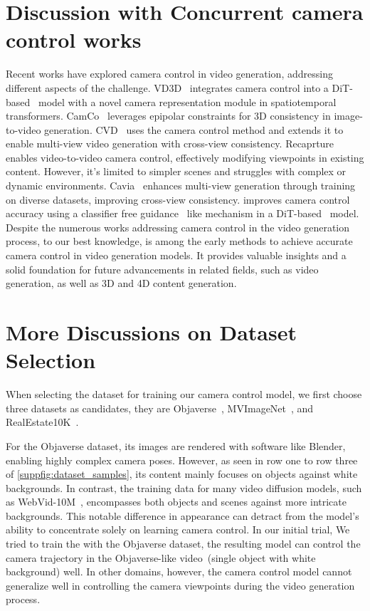 \section{Discussion with Concurrent camera control works} \label{suppsec:discuss_cameractrl}
Recent works have explored camera control in video generation, addressing different aspects of the challenge.
%
VD3D~\citep{vd3d} integrates camera control into a DiT-based~\citep{dit,snapvideo} model with a novel camera representation module in spatiotemporal transformers. 
%
CamCo~\citep{camco} leverages epipolar constraints for 3D consistency in image-to-video generation.
%
CVD~\citep{cvd} uses the camera control method and extends it to enable multi-view video generation with cross-view consistency.
%
Recaprture~\citep{recapture} enables video-to-video camera control, effectively modifying viewpoints in existing content.
%
However, it's limited to simpler scenes and struggles with complex or dynamic environments.
%
Cavia~\citep{cavia} enhances multi-view generation through training on diverse datasets, improving cross-view consistency.
%
\citep{cmg} improves camera control accuracy using a classifier free guidance~\cite{cfg} like mechanism in a DiT-based~\cite{opensora} model.
%
Despite the numerous works addressing camera control in the video generation process, to our best knowledge, \method is among the early methods to achieve accurate camera control in video generation models.
%
It provides valuable insights and a solid foundation for future advancements in related fields, such as video generation, as well as 3D and 4D content generation.

\section{More Discussions on Dataset Selection}
\label{suppsec:data_selection}
When selecting the dataset for training our camera control model, 
we first choose three datasets as candidates, they are Objaverse~\citep{objaverse}, MVImageNet~\citep{mvimgnet}, and RealEstate10K~\citep{realestate10k}.

For the Objaverse dataset, its images are rendered with software like Blender, enabling highly complex camera poses.
%
However, as seen in row one to row three of \cref{suppfig:dataset_samples}, its content mainly focuses on objects against white backgrounds. 
%
In contrast, the training data for many video diffusion models, such as WebVid-10M~\citep{webvid10m}, encompasses both objects and scenes against more intricate backgrounds.
%
This notable difference in appearance can detract from the model's ability to concentrate solely on learning camera control.
%
In our initial trial, We tried to train the \method with the Objaverse dataset, the resulting model can control the camera trajectory in the Objaverse-like video~(single object with white background) well.
%
In other domains, however, the camera control model cannot generalize well in controlling the camera viewpoints during the video generation process.

